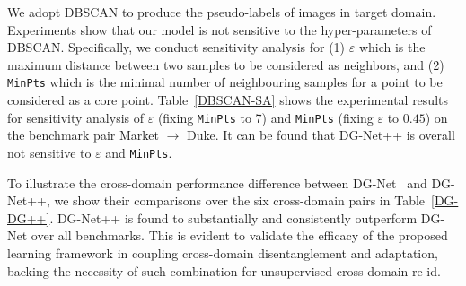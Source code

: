 \documentclass[runningheads]{llncs}
\begin{document}
\begin{table}[b]
\vspace{-12pt}
\centering
{}
\vspace{1mm}
\caption{Comparison between DG-Net and DG-Net++ for unsupervised cross-domain person re-id on the six benchmark pairs.}
\label{DG-DG++}
\vspace{-12pt}
\end{table}

 We adopt DBSCAN to produce the pseudo-labels of images in target domain. Experiments show that our model is not sensitive to the hyper-parameters of DBSCAN. Specifically, we conduct sensitivity analysis for (1) $\varepsilon$ which is the maximum distance between two samples to be considered as neighbors, and (2) \texttt{MinPts} which is the minimal number of neighbouring samples for a point to be considered as a core point. Table~\ref{DBSCAN-SA} shows the experimental results for sensitivity analysis of $\varepsilon$ (fixing \texttt{MinPts} to 7) and \texttt{MinPts} (fixing $\varepsilon$ to $0.45$) on the benchmark pair Market $\rightarrow$ Duke. It can be found that DG-Net++ is overall not sensitive to $\varepsilon$ and \texttt{MinPts}.

 To illustrate the cross-domain performance difference between DG-Net~\cite{zheng2019joint} and DG-Net++, we show their comparisons over the six cross-domain pairs in Table~\ref{DG-DG++}. DG-Net++ is found to substantially and consistently outperform DG-Net over all benchmarks. This is evident to validate the efficacy of the proposed learning framework in coupling cross-domain disentanglement and adaptation, backing the necessity of such combination for unsupervised cross-domain re-id. 
\end{document}
